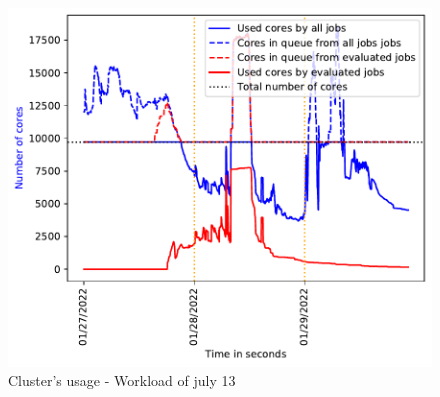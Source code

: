 \documentclass[conference,10pt]{IEEEtran}
\begin{document}
\begin{figure}\centering\includegraphics[width=1\linewidth]{../MBSS/plot/2022-07-13->2022-07-13_V10000_Fcfs_Used_nodes_Reduced_450_128_32_256_4_1024.pdf}\caption{Cluster's usage - Workload of july 13}\end{figure}
\end{document}
